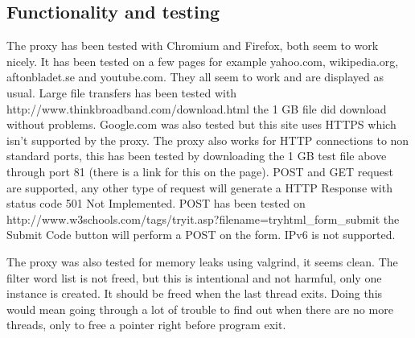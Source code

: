 \documentclass[a4paper,11pt]{article}
\begin{document}
\subsection{Functionality and testing}
The proxy has been tested with Chromium and Firefox, both seem to work nicely.
It has been tested on a few pages for example yahoo.com, wikipedia.org, aftonbladet.se and youtube.com.
They all seem to work and are displayed as usual.
Large file transfers has been tested with http://www.thinkbroadband.com/download.html the 1 GB file did download without problems.
Google.com was also tested but this site uses HTTPS which isn't supported by the proxy.
The proxy also works for HTTP connections to non standard ports, this has been tested by downloading the 1 GB test file above through port 81 (there is a link for this on the page).
POST and GET request are supported, any other type of request will generate a HTTP Response with status code 501 Not Implemented.
POST has been tested on http://www.w3schools.com/tags/tryit.asp?filename=tryhtml\_form\_submit the Submit Code button will perform a POST on the form.
IPv6 is not supported.

The proxy was also tested for memory leaks using valgrind, it seems clean.
The filter word list is not freed, but this is intentional and not harmful, only one instance is created.
It should be freed when the last thread exits. 
Doing this would mean going through a lot of trouble to find out when there are no more threads, only to free a pointer right before program exit.

\end{document}
